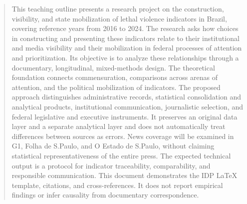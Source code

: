 \begin{abstract}
This teaching outline presents a research project on the construction, visibility, and state mobilization of lethal violence indicators in Brazil, covering reference years from 2016 to 2024. The research asks how choices in constructing and presenting these indicators relate to their institutional and media visibility and their mobilization in federal processes of attention and prioritization. Its objective is to analyze these relationships through a documentary, longitudinal, mixed-methods design. The theoretical foundation connects commensuration, comparisons across arenas of attention, and the political mobilization of indicators. The proposed approach distinguishes administrative records, statistical consolidation and analytical products, institutional communication, journalistic selection, and federal legislative and executive instruments. It preserves an original data layer and a separate analytical layer and does not automatically treat differences between sources as errors. News coverage will be examined in G1, Folha de S.Paulo, and O Estado de S.Paulo, without claiming statistical representativeness of the entire press. The expected technical output is a protocol for indicator traceability, comparability, and responsible communication. This document demonstrates the IDP LaTeX template, citations, and cross-references. It does not report empirical findings or infer causality from documentary correspondence.
\end{abstract}

